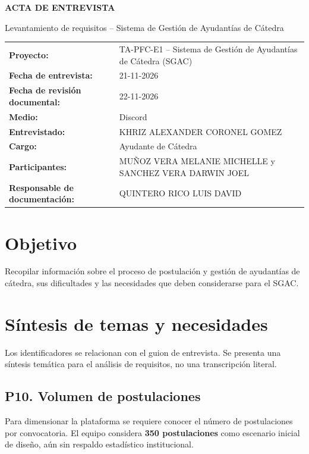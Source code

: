 \documentclass[12pt,a4paper]{article}
\begin{document}
\begin{center}
  {\bfseries\fontsize{14}{17}\selectfont ACTA DE ENTREVISTA}\par
  \vspace{3pt}
  {\fontsize{12}{15}\selectfont Levantamiento de requisitos -- Sistema de Gestión de Ayudantías de Cátedra}
\end{center}
\vspace{6pt}

\noindent\begin{tabularx}{\textwidth}{@{}>{\bfseries}p{4.8cm}X@{}}
Proyecto: & TA-PFC-E1 -- Sistema de Gestión de Ayudantías de Cátedra (SGAC) \\
Fecha de entrevista: & 21-11-2026 \\
Fecha de revisión documental: & 22-11-2026 \\
Medio: & Discord \\
Entrevistado: & KHRIZ ALEXANDER CORONEL GOMEZ \\
Cargo: & Ayudante de Cátedra \\
Participantes: & MUÑOZ VERA MELANIE MICHELLE y SANCHEZ VERA DARWIN JOEL \\
Responsable de documentación: & QUINTERO RICO LUIS DAVID \\
\end{tabularx}

\section{Objetivo}
Recopilar información sobre el proceso de postulación y gestión de ayudantías de cátedra, sus dificultades y las necesidades que deben considerarse para el SGAC.

\section{Síntesis de temas y necesidades}
Los identificadores se relacionan con el guion de entrevista. Se presenta una síntesis temática para el análisis de requisitos, no una transcripción literal.

\subsection{P10. Volumen de postulaciones}
Para dimensionar la plataforma se requiere conocer el número de postulaciones por convocatoria. El equipo considera \textbf{350 postulaciones} como escenario inicial de diseño, aún sin respaldo estadístico institucional.
\end{document}

